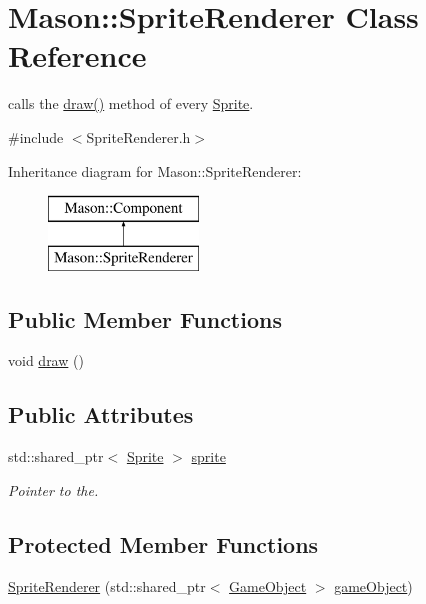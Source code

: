 \hypertarget{class_mason_1_1_sprite_renderer}{}\section{Mason\+:\+:Sprite\+Renderer Class Reference}
\label{class_mason_1_1_sprite_renderer}


calls the \hyperlink{class_mason_1_1_sprite_renderer_aeeeaa7eb5c340b7c2abad3d4785fd1e1}{draw()} method of every \hyperlink{class_mason_1_1_sprite}{Sprite}.  




{\ttfamily \#include $<$Sprite\+Renderer.\+h$>$}

Inheritance diagram for Mason\+:\+:Sprite\+Renderer\+:\begin{figure}[H]
\begin{center}
\leavevmode
\includegraphics[height=2.000000cm]{class_mason_1_1_sprite_renderer}
\end{center}
\end{figure}
\subsection*{Public Member Functions}
\begin{DoxyCompactItemize}
\item 
void \hyperlink{class_mason_1_1_sprite_renderer_aeeeaa7eb5c340b7c2abad3d4785fd1e1}{draw} ()
\end{DoxyCompactItemize}
\subsection*{Public Attributes}
\begin{DoxyCompactItemize}
\item 
std\+::shared\+\_\+ptr$<$ \hyperlink{class_mason_1_1_sprite}{Sprite} $>$ \hyperlink{class_mason_1_1_sprite_renderer_a17a9d82d45d7ae1058542e5c939122c6}{sprite}
\begin{DoxyCompactList}\small\item\em Pointer to the. \end{DoxyCompactList}\end{DoxyCompactItemize}
\subsection*{Protected Member Functions}
\begin{DoxyCompactItemize}
\item 
\hyperlink{class_mason_1_1_sprite_renderer_a86df3a66134c1adb0d95b7a63c9432eb}{Sprite\+Renderer} (std\+::shared\+\_\+ptr$<$ \hyperlink{class_mason_1_1_game_object}{Game\+Object} $>$ \hyperlink{class_mason_1_1_component_abaa67b569d0a70e26a4606f4a099a925}{game\+Object})
\end{DoxyCompactItemize}
